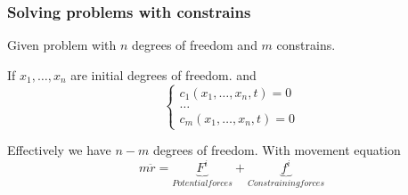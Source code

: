 \subsubsection{Solving problems with constrains}
Given problem with $n$ degrees of freedom and $m$ constrains.

If $x_1, \dots, x_n$ are initial degrees of freedom.
and
$$\begin{cases} c_1(x_1, \dots, x_n, t) = 0 \\ \dots \\ c_m(x_1, \dots, x_n, t) = 0 \end{cases}$$

Effectively we have $n-m$ degrees of freedom. With movement equation
$$m\ddot{r} = \underbrace{F^i}_{Potential forces} + \underbrace{f^i}_{Constraining forces}$$